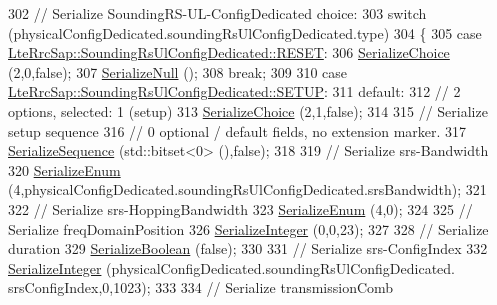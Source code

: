 \begin{DoxyCode}
302       \textcolor{comment}{// Serialize SoundingRS-UL-ConfigDedicated choice:}
303       \textcolor{keywordflow}{switch} (physicalConfigDedicated.soundingRsUlConfigDedicated.type)
304         \{
305         \textcolor{keywordflow}{case} \hyperlink{structns3_1_1LteRrcSap_1_1SoundingRsUlConfigDedicated_a79c5b04ec873cbf1a52b7e0d9b76a5a7acf6c9469b179db793d38b6d3e78516f5}{LteRrcSap::SoundingRsUlConfigDedicated::RESET}:
306           \hyperlink{classns3_1_1Asn1Header_a400ef4a710499da80fc55e23a973d4fa}{SerializeChoice} (2,0,\textcolor{keyword}{false});
307           \hyperlink{classns3_1_1Asn1Header_ad1814fa357d2148457d7e4ade1ab84a8}{SerializeNull} ();
308           \textcolor{keywordflow}{break};
309 
310         \textcolor{keywordflow}{case} \hyperlink{structns3_1_1LteRrcSap_1_1SoundingRsUlConfigDedicated_a79c5b04ec873cbf1a52b7e0d9b76a5a7a457376b675eb174369652c323f5f9a36}{LteRrcSap::SoundingRsUlConfigDedicated::SETUP}:
311         \textcolor{keywordflow}{default}:
312           \textcolor{comment}{// 2 options, selected: 1 (setup)}
313           \hyperlink{classns3_1_1Asn1Header_a400ef4a710499da80fc55e23a973d4fa}{SerializeChoice} (2,1,\textcolor{keyword}{false});
314 
315           \textcolor{comment}{// Serialize setup sequence}
316           \textcolor{comment}{// 0 optional / default fields, no extension marker.}
317           \hyperlink{classns3_1_1Asn1Header_aa9744858380443ed95836fed08799aed}{SerializeSequence} (std::bitset<0> (),\textcolor{keyword}{false});
318 
319           \textcolor{comment}{// Serialize srs-Bandwidth}
320           \hyperlink{classns3_1_1Asn1Header_ac8e56956823ab8e4470c09e162e7bf24}{SerializeEnum} (4,physicalConfigDedicated.soundingRsUlConfigDedicated.srsBandwidth);
321 
322           \textcolor{comment}{// Serialize  srs-HoppingBandwidth}
323           \hyperlink{classns3_1_1Asn1Header_ac8e56956823ab8e4470c09e162e7bf24}{SerializeEnum} (4,0);
324 
325           \textcolor{comment}{// Serialize freqDomainPosition}
326           \hyperlink{classns3_1_1Asn1Header_ab1c3bd37730affa7473bc759d625c29a}{SerializeInteger} (0,0,23);
327 
328           \textcolor{comment}{// Serialize duration}
329           \hyperlink{classns3_1_1Asn1Header_a28e3626acdffec71c0376f4f3e7e7ec4}{SerializeBoolean} (\textcolor{keyword}{false});
330 
331           \textcolor{comment}{// Serialize srs-ConfigIndex}
332           \hyperlink{classns3_1_1Asn1Header_ab1c3bd37730affa7473bc759d625c29a}{SerializeInteger} (physicalConfigDedicated.soundingRsUlConfigDedicated.
      srsConfigIndex,0,1023);
333 
334           \textcolor{comment}{// Serialize transmissionComb}

\end{DoxyCode}
